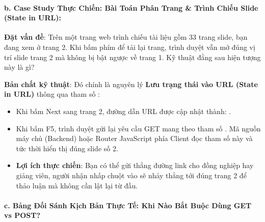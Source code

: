 \paragraph{b. Case Study Thực Chiến: Bài Toán Phân Trang \& Trình Chiếu Slide (State in URL):}
\begin{conceptBox}
\textbf{Đặt vấn đề}: Trên một trang web trình chiếu tài liệu gồm 33 trang slide, bạn đang xem ở trang 2. Khi bấm phím  để tải lại trang, trình duyệt vẫn mở đúng vị trí slide trang 2 mà không bị bật ngược về trang 1. Kỹ thuật đằng sau hiện tượng này là gì?

\textbf{Bản chất kỹ thuật}: Đó chính là nguyên lý \textbf{Lưu trạng thái vào URL (State in URL)} thông qua tham số :
\begin{itemize}[leftmargin=1.5em, itemsep=3pt, parsep=0pt]
    \item Khi bấm Next sang trang 2, đường dẫn URL được cập nhật thành: .
    \item Khi bấm F5, trình duyệt gửi lại yêu cầu GET mang theo tham số . Mã nguồn máy chủ (Backend) hoặc Router JavaScript phía Client đọc tham số này và tức thời hiển thị đúng slide số 2.
    \item \textbf{Lợi ích thực chiến}: Bạn có thể gửi thẳng đường link  cho đồng nghiệp hay giảng viên, người nhận nhấp chuột vào sẽ nhảy thẳng tới đúng trang 2 để thảo luận mà không cần lật lại từ đầu.
\end{itemize}
\end{conceptBox}

\paragraph{c. Bảng Đối Sánh Kịch Bản Thực Tế: Khi Nào Bắt Buộc Dùng GET vs POST?}


